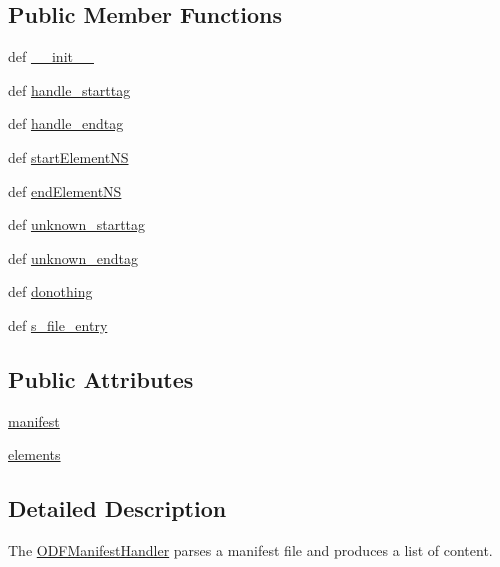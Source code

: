 \subsection*{Public Member Functions}
\begin{DoxyCompactItemize}
\item 
def \hyperlink{classodf_1_1odfmanifest_1_1ODFManifestHandler_a6621e637fd0b8e904b87b0d934073ea9}{\+\_\+\+\_\+init\+\_\+\+\_\+}
\item 
def \hyperlink{classodf_1_1odfmanifest_1_1ODFManifestHandler_a9932285fd0c71f1b00dfaa82e00c3ceb}{handle\+\_\+starttag}
\item 
def \hyperlink{classodf_1_1odfmanifest_1_1ODFManifestHandler_adb6ff16bb30f1c13e80e0afd437404d1}{handle\+\_\+endtag}
\item 
def \hyperlink{classodf_1_1odfmanifest_1_1ODFManifestHandler_ae9b7200c52dc65bc1ee86e1737f3a464}{start\+Element\+N\+S}
\item 
def \hyperlink{classodf_1_1odfmanifest_1_1ODFManifestHandler_ac9e0252999876f8f70e4bdbbb20bcba7}{end\+Element\+N\+S}
\item 
def \hyperlink{classodf_1_1odfmanifest_1_1ODFManifestHandler_a1a13ef4fd1ec9ac8512a12af644cf7e3}{unknown\+\_\+starttag}
\item 
def \hyperlink{classodf_1_1odfmanifest_1_1ODFManifestHandler_a337302e32dbf1cc93a60be2881ef787b}{unknown\+\_\+endtag}
\item 
def \hyperlink{classodf_1_1odfmanifest_1_1ODFManifestHandler_a67780a16b79bb753bd49efbada5d559b}{donothing}
\item 
def \hyperlink{classodf_1_1odfmanifest_1_1ODFManifestHandler_a82393722a5db79321da8c0796c33f366}{s\+\_\+file\+\_\+entry}
\end{DoxyCompactItemize}
\subsection*{Public Attributes}
\begin{DoxyCompactItemize}
\item 
\hyperlink{classodf_1_1odfmanifest_1_1ODFManifestHandler_a6c4e396649fdb2ed1af0b332977efa58}{manifest}
\item 
\hyperlink{classodf_1_1odfmanifest_1_1ODFManifestHandler_aaff81d529c30f7486c8eac6cdc616ca7}{elements}
\end{DoxyCompactItemize}


\subsection{Detailed Description}
The \hyperlink{classodf_1_1odfmanifest_1_1ODFManifestHandler}{O\+D\+F\+Manifest\+Handler} parses a manifest file and produces a list of content. 

